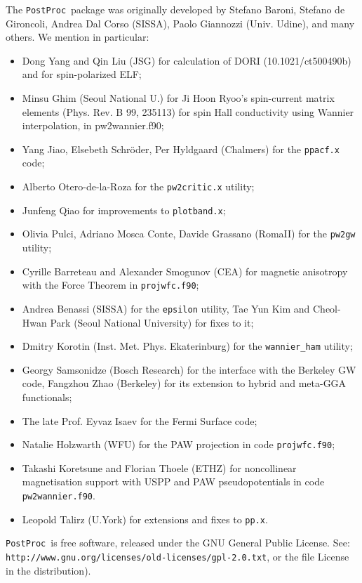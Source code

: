 \documentclass[12pt,a4paper]{article}
\def\PostProc{\texttt{PostProc}}
\begin{document}
The \PostProc\ package was originally developed by Stefano Baroni, 
Stefano de Gironcoli, Andrea Dal Corso (SISSA), Paolo Giannozzi 
(Univ. Udine), and many others. We mention in particular: 
\begin{itemize}
\item Dong Yang and Qin Liu (JSG) for calculation of DORI (10.1021/ct500490b)
      and for spin-polarized ELF;
\item Minsu Ghim (Seoul National U.) for Ji Hoon Ryoo's spin-current matrix
      elements (Phys. Rev. B 99, 235113) for spin Hall conductivity using
      Wannier interpolation, in pw2wannier.f90;
\item Yang Jiao, Elsebeth Schr\"oder, Per Hyldgaard (Chalmers) for the
  \texttt{ppacf.x} code;
\item Alberto Otero-de-la-Roza for the \texttt{pw2critic.x} utility;
\item Junfeng Qiao for improvements to \texttt{plotband.x};
\item Olivia Pulci, Adriano Mosca Conte, Davide Grassano (RomaII)
      for the \texttt{pw2gw} utility;
\item Cyrille Barreteau and Alexander Smogunov (CEA) for 
      magnetic anisotropy with the Force Theorem in \texttt{projwfc.f90};
\item Andrea Benassi (SISSA) for the \texttt{epsilon} utility,
      Tae Yun Kim and Cheol-Hwan Park (Seoul National University)
      for fixes to it;
\item Dmitry Korotin (Inst. Met. Phys. Ekaterinburg) for the
      \texttt{wannier\_ham} utility;
\item Georgy Samsonidze (Bosch Research) for the interface
      with the Berkeley GW code, Fangzhou Zhao (Berkeley) 
      for its extension to hybrid and meta-GGA functionals;
\item The late Prof. Eyvaz Isaev for the Fermi Surface code;
\item Natalie Holzwarth (WFU) for the PAW projection in code
     \texttt{projwfc.f90};
\item Takashi Koretsune and Florian Thoele (ETHZ) for noncollinear 
      magnetisation support with USPP and PAW pseudopotentials in 
      code \texttt{pw2wannier.f90}.
\item Leopold Talirz (U.York) for extensions and fixes to \texttt{pp.x}.
\end{itemize}

\PostProc\ is free software, released under the 
GNU General Public License. See:\\
\texttt{http://www.gnu.org/licenses/old-licenses/gpl-2.0.txt}, 
or the file License in the distribution).
    
\end{document}
